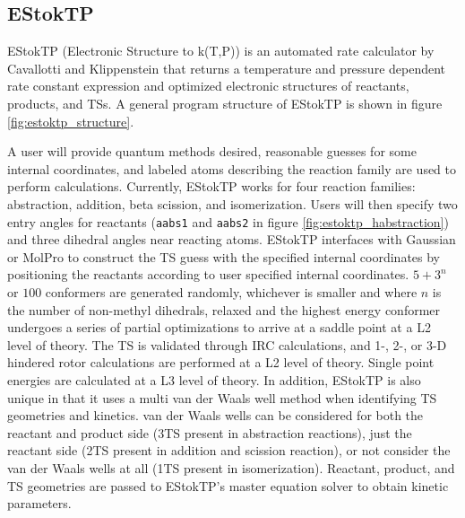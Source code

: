 \documentclass[preprint, 11pt]{elsarticle} %
\begin{document}
\subsection{EStokTP}


EStokTP (Electronic Structure to k(T,P)) \cite{Cavallotti:2019jctc} is an automated rate calculator by Cavallotti and Klippenstein that returns a temperature and pressure dependent rate constant expression and optimized electronic structures of reactants, products, and TSs.
A general program structure of EStokTP is shown in figure \ref{fig:estoktp_structure}.

A user will provide quantum methods desired, reasonable guesses for some internal coordinates, and labeled atoms describing the reaction family are used to perform calculations.
Currently, EStokTP works for four reaction families: abstraction, addition, beta scission, and isomerization. 
Users will then specify two entry angles for reactants (\texttt{aabs1} and \texttt{aabs2} in figure \ref{fig:estoktp_habstraction}) and three dihedral angles near reacting atoms.
EStokTP interfaces with Gaussian \cite{Gaussian:2009} or MolPro \cite{molpro:2012} to construct the TS guess with the specified internal coordinates by positioning the reactants according to user specified internal coordinates. 
$5 + 3^n$ or $100$ conformers are generated randomly, whichever is smaller and where $n$ is the number of non-methyl dihedrals, relaxed and the highest energy conformer undergoes a series of partial optimizations to arrive at a saddle point at a L2 level of theory. 
The TS is validated  through IRC calculations, and 1-, 2-, or 3-D hindered rotor calculations are performed at a L2 level of theory.
Single point energies are calculated at a L3 level of theory.
In addition, EStokTP is also unique in that it uses a multi van der Waals well method when identifying TS geometries and kinetics.
van der Waals wells can be considered for both the reactant and product side (3TS present in abstraction reactions), just the reactant side (2TS present in addition and scission reaction), or not consider the van der Waals wells at all (1TS present in isomerization).
Reactant, product, and TS geometries are passed to EStokTP's master equation solver to obtain kinetic parameters.
\end{document}
